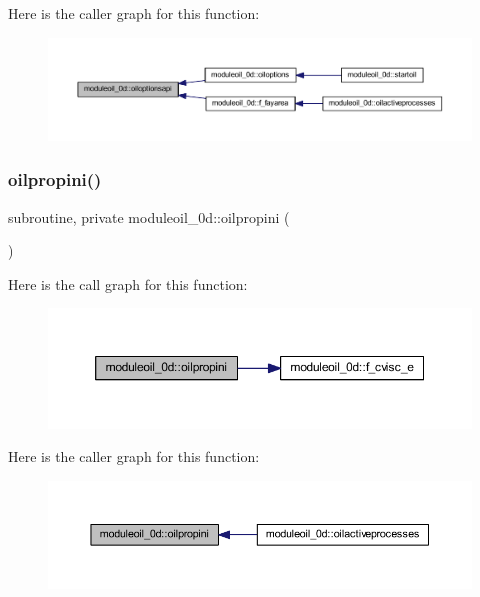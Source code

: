 Here is the caller graph for this function\+:\nopagebreak
\begin{figure}[H]
\begin{center}
\leavevmode
\includegraphics[width=350pt]{namespacemoduleoil__0d_aee1786140ad8f5a32f57df0b719d830b_icgraph}
\end{center}
\end{figure}
\mbox{\label{namespacemoduleoil__0d_a09a236d3f574c98899645e4bed0ef095}} 
\subsubsection{\texorpdfstring{oilpropini()}{oilpropini()}}
{\footnotesize\ttfamily subroutine, private moduleoil\+\_\+0d\+::oilpropini (\begin{DoxyParamCaption}{ }\end{DoxyParamCaption})\hspace{0.3cm}{\ttfamily [private]}}

Here is the call graph for this function\+:\nopagebreak
\begin{figure}[H]
\begin{center}
\leavevmode
\includegraphics[width=350pt]{namespacemoduleoil__0d_a09a236d3f574c98899645e4bed0ef095_cgraph}
\end{center}
\end{figure}
Here is the caller graph for this function\+:\nopagebreak
\begin{figure}[H]
\begin{center}
\leavevmode
\includegraphics[width=350pt]{namespacemoduleoil__0d_a09a236d3f574c98899645e4bed0ef095_icgraph}
\end{center}
\end{figure}
\mbox{\label{namespacemoduleoil__0d_aa7833f46fb80b6ff52234957c56b77d2}} 
